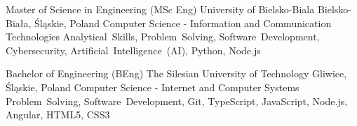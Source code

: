 
\begin{cventries}

  \cventry
    {Master of Science in Engineering (MSc Eng)} %
    {University of Bielsko-Biala} %
    {Bielsko-Biała, Śląskie, Poland} %
    {} %
    {Computer Science - Information and Communication Technologies}
    {Analytical~Skills, Problem~Solving, Software~Development, Cybersecurity, Artificial~Intelligence~(AI), Python, Node.js}

  \cventry
    {Bachelor of Engineering (BEng)} %
    {The Silesian University of Technology} %
    {Gliwice, Śląskie, Poland} %
    {} %
    {Computer Science - Internet and Computer Systems}
    {Problem~Solving, Software~Development, Git, TypeScript, JavaScript, Node.js, Angular, HTML5, CSS3}

\end{cventries}
